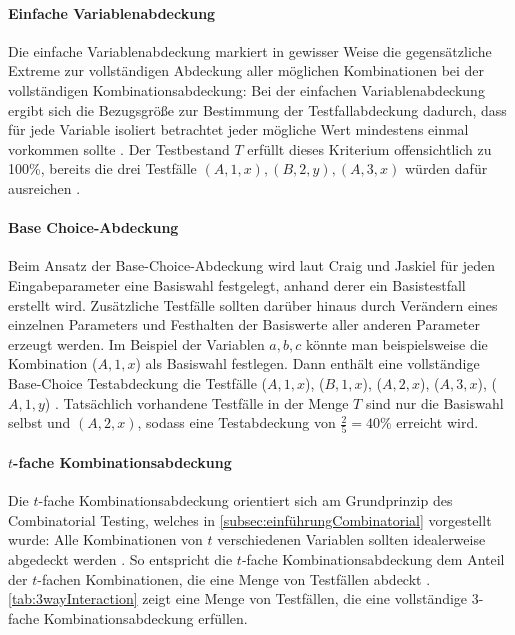 \paragraph{Einfache Variablenabdeckung}

Die einfache Variablenabdeckung markiert in gewisser Weise die gegensätzliche Extreme zur vollständigen Abdeckung aller möglichen Kombinationen bei der vollständigen Kombinationsabdeckung: Bei der einfachen Variablenabdeckung ergibt sich die Bezugsgröße zur Bestimmung der Testfallabdeckung dadurch, dass für jede Variable isoliert betrachtet jeder mögliche Wert mindestens einmal vorkommen sollte \cite[S. 160 f.]{craig2002systematic}. Der Testbestand $T$ erfüllt dieses Kriterium offensichtlich zu 100\%, bereits die drei Testfälle $(A, 1, x), (B, 2, y), (A, 3, x)$ würden dafür ausreichen \cite[S. 160 f.]{craig2002systematic}. 

\paragraph{Base Choice-Abdeckung}

Beim Ansatz der Base-Choice-Abdeckung wird laut Craig und Jaskiel \cite[S. 162]{craig2002systematic} für jeden Eingabeparameter eine Basiswahl festgelegt, anhand derer ein Basistestfall erstellt wird. Zusätzliche Testfälle sollten darüber hinaus durch Verändern eines einzelnen Parameters und Festhalten der Basiswerte aller anderen Parameter erzeugt werden. Im Beispiel der Variablen $a,b,c$ könnte man beispielsweise die Kombination ($A,1,x$) als Basiswahl festlegen. Dann enthält eine vollständige Base-Choice Testabdeckung die Testfälle ($A,1,x$), ($B,1,x$), ($A,2,x$), ($A,3,x$), ($A,1,y$) \cite[S. 162]{craig2002systematic}. Tatsächlich vorhandene Testfälle in der Menge $T$ sind nur die Basiswahl selbst und $(A,2,x)$, sodass eine Testabdeckung von $\frac{2}{5} = 40 \%$ erreicht wird.

\paragraph{$t$-fache Kombinationsabdeckung}

Die $t$-fache Kombinationsabdeckung orientiert sich am Grundprinzip des Combinatorial Testing, welches in \autoref{subsec:einführungCombinatorial} vorgestellt wurde: Alle Kombinationen von $t$ verschiedenen Variablen sollten idealerweise abgedeckt werden \cite{kuhn2010practical}. So entspricht die $t$-fache Kombinationsabdeckung dem Anteil der $t$-fachen Kombinationen, die eine Menge von Testfällen abdeckt \cite{kuhn2010practical}. \autoref{tab:3wayInteraction} zeigt eine Menge von Testfällen, die eine vollständige 3-fache Kombinationsabdeckung erfüllen.
 
